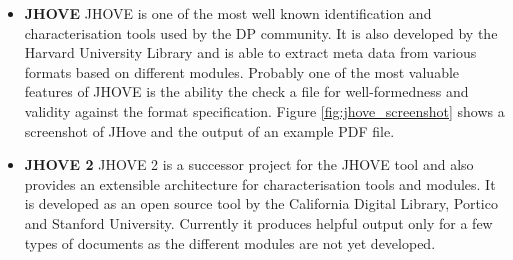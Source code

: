 \begin{itemize}
\item \textbf{JHOVE}\newline
JHOVE is one of the most well known identification and characterisation tools used by the DP community. It is also developed by the Harvard University Library and is able to extract meta data from various formats based on different modules. Probably one of the most valuable features of JHOVE is the ability the check a file for well-formedness and validity against the format specification. Figure \ref{fig:jhove_screenshot} shows a screenshot of JHove and the output of an example PDF file.

\item \textbf{JHOVE 2}\newline
JHOVE 2 is a successor project for the JHOVE tool and also provides an extensible architecture for characterisation tools and modules. It is developed as an open source tool by the California Digital Library, Portico and Stanford University. Currently it produces helpful output only for a few types of documents as the different modules are not yet developed.
\end{itemize}

